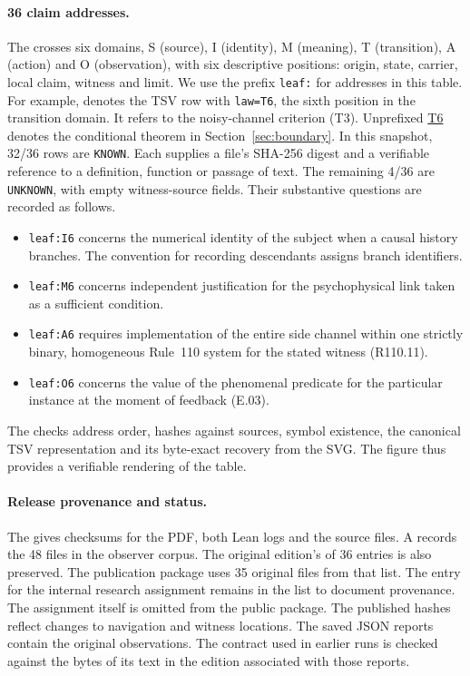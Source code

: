 \paragraph{36 claim addresses.}
The  crosses six domains, S (source), I (identity), M (meaning), T (transition), A (action) and O (observation), with six descriptive positions: origin, state, carrier, local claim, witness and limit. We use the prefix \texttt{leaf:} for addresses in this table. For example,  denotes the TSV row with \texttt{law=T6}, the sixth position in the transition domain. It refers to the noisy-channel criterion (T3). Unprefixed \hyperref[thm:conditional-bridge]{T6} denotes the conditional theorem in Section~\ref{sec:boundary}. In this snapshot, 32/36 rows are \texttt{KNOWN}. Each supplies a file's SHA-256 digest and a verifiable reference to a definition, function or passage of text. The remaining 4/36 are \texttt{UNKNOWN}, with empty witness-source fields. Their substantive questions are recorded as follows.
\begin{itemize}
\item \texttt{leaf:I6} concerns the numerical identity of the subject when a causal history branches. The convention for recording descendants assigns branch identifiers.
\item \texttt{leaf:M6} concerns independent justification for the psychophysical link taken as a sufficient condition.
\item \texttt{leaf:A6} requires implementation of the entire side channel within one strictly binary, homogeneous Rule~110 system for the stated witness (R110.11).
\item \texttt{leaf:O6} concerns the value of the phenomenal predicate for the particular instance at the moment of feedback (E.03).
\end{itemize}
The  checks address order, hashes against sources, symbol existence, the canonical TSV representation and its byte-exact recovery from the SVG. The figure thus provides a verifiable rendering of the table.

\paragraph{Release provenance and status.}
The  gives checksums for the PDF, both Lean logs and the source files. A  records the 48 files in the observer corpus. The original edition's  of 36 entries is also preserved. The publication package uses 35 original files from that list. The entry for the internal research assignment remains in the list to document provenance. The assignment itself is omitted from the public package. The published hashes reflect changes to navigation and witness locations. The saved JSON reports contain the original observations. The contract used in earlier runs is checked against the bytes of its text in the edition associated with those reports.

